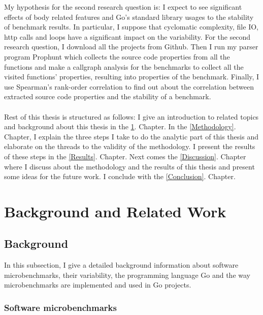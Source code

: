 \documentclass{seal_thesis}
\begin{document}
\noindent My hypothesis for the second research question is: I expect to see significant effects of body related features and Go's standard library usages to the stability of benchmark results. In particular, I suppose that cyclomatic complexity, file IO, http calls and loops have a significant impact on the variability. For the second research question, I download all the projects from Github. Then I run my parser program Prophunt which collects the source code properties from all the functions and make a callgraph analysis for the benchmarks to collect all the visited functions' properties, resulting into properties of the benchmark. Finally, I use Spearman's rank-order correlation to find out about the correlation between extracted source code properties and the stability of a benchmark.\\
\\
Rest of this thesis is structured as follows: I give an introduction to related topics and background about this thesis in the \ref{Background and Related Work}. Chapter. In the \ref{Methodology}. Chapter, I explain the three steps I take to do the analytic part of this thesis and elaborate on the threads to the validity of the methodology. I present the results of these steps in the \ref{Results}. Chapter. Next comes the \ref{Discussion}. Chapter where I discuss about the methodology and the results of this thesis and present some ideas for the future work. I conclude with the \ref{Conclusion}. Chapter.

\chapter{Background and Related Work}
\label{Background and Related Work}

\section{Background}

In this subsection, I give a detailed background information about software microbenchmarks, their variability, the programming language Go and the way microbenchmarks are implemented and used in Go projects.

\subsection{Software microbenchmarks}
\end{document}
